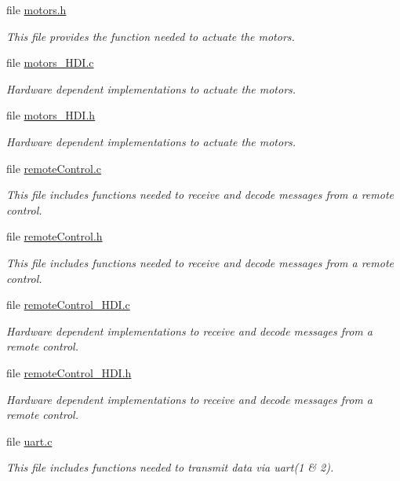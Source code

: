 \begin{DoxyCompactItemize}
file \hyperlink{motors_8h}{motors.\+h}
\begin{DoxyCompactList}\small\item\em This file provides the function needed to actuate the motors. \end{DoxyCompactList}\item 
file \hyperlink{motors__HDI_8c}{motors\+\_\+\+H\+D\+I.\+c}
\begin{DoxyCompactList}\small\item\em Hardware dependent implementations to actuate the motors. \end{DoxyCompactList}\item 
file \hyperlink{motors__HDI_8h}{motors\+\_\+\+H\+D\+I.\+h}
\begin{DoxyCompactList}\small\item\em Hardware dependent implementations to actuate the motors. \end{DoxyCompactList}\item 
file \hyperlink{remoteControl_8c}{remote\+Control.\+c}
\begin{DoxyCompactList}\small\item\em This file includes functions needed to receive and decode messages from a remote control. \end{DoxyCompactList}\item 
file \hyperlink{remoteControl_8h}{remote\+Control.\+h}
\begin{DoxyCompactList}\small\item\em This file includes functions needed to receive and decode messages from a remote control. \end{DoxyCompactList}\item 
file \hyperlink{remoteControl__HDI_8c}{remote\+Control\+\_\+\+H\+D\+I.\+c}
\begin{DoxyCompactList}\small\item\em Hardware dependent implementations to receive and decode messages from a remote control. \end{DoxyCompactList}\item 
file \hyperlink{remoteControl__HDI_8h}{remote\+Control\+\_\+\+H\+D\+I.\+h}
\begin{DoxyCompactList}\small\item\em Hardware dependent implementations to receive and decode messages from a remote control. \end{DoxyCompactList}\item 
file \hyperlink{uart_8c}{uart.\+c}
\begin{DoxyCompactList}\small\item\em This file includes functions needed to transmit data via uart(1 \& 2). \end{DoxyCompactList}\item 

\end{DoxyCompactItemize}
